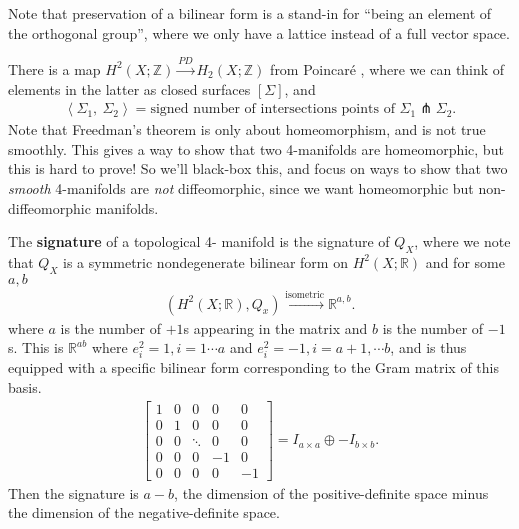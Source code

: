 \begin{remark}

Note that preservation of a bilinear form is a stand-in for ``being an
element of the orthogonal group'', where we only have a lattice instead
of a full vector space.

\end{remark}

\begin{remark}

There is a map
\(H^2(X; {\mathbb{Z}}) \xrightarrow{PD} H_2(X; {\mathbb{Z}})\) from
Poincaré , where we can think of elements in the latter as closed
surfaces \([\Sigma]\), and
\begin{align*}
{\left\langle { \Sigma_1 },~{ \Sigma_2 } \right\rangle} = \text{signed number of intersections points of } \Sigma_1 \pitchfork\Sigma_2
.\end{align*}
Note that Freedman's theorem is only about homeomorphism, and is not
true smoothly. This gives a way to show that two 4-manifolds are
homeomorphic, but this is hard to prove! So we'll black-box this, and
focus on ways to show that two \emph{smooth} 4-manifolds are \emph{not}
diffeomorphic, since we want homeomorphic but non-diffeomorphic
manifolds.

\end{remark}

\begin{definition}[Signature]

The \textbf{signature} of a topological 4- manifold is the signature of
\(Q_X\), where we note that \(Q_X\) is a symmetric nondegenerate
bilinear form on \(H^2(X; {\mathbb{R}})\) and for some \(a, b\)
\begin{align*}
(H^2(X; {\mathbb{R}}), Q_x) \xrightarrow{\text{isometric}} {\mathbb{R}}^{a, b}
.\end{align*}
where \(a\) is the number of \(+1\)s appearing in the matrix and \(b\)
is the number of \(-1\)s. This is \({\mathbb{R}}^{ab}\) where
\(e_i^2 = 1, i=1\cdots a\) and \(e_i^2 = -1, i=a+1, \cdots b\), and is
thus equipped with a specific bilinear form corresponding to the Gram
matrix of this basis.
\begin{align*}
\begin{bmatrix}
1 & 0 & 0 & 0 & 0
\\
0 & 1 & 0 & 0 & 0
\\
0 & 0 & \ddots & 0 & 0
\\
0 & 0 & 0 & -1 & 0
\\
0 & 0 & 0 & 0 & -1
\end{bmatrix}
= I_{a\times a} \oplus -I_{b \times b}
.\end{align*}
Then the signature is \(a-b\), the dimension of the positive-definite
space minus the dimension of the negative-definite space.

\end{definition}

